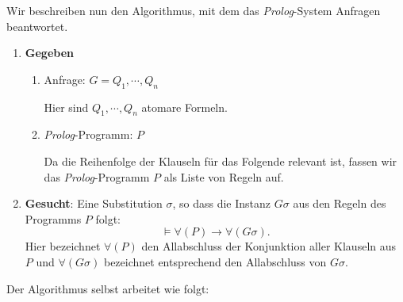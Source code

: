 Wir beschreiben nun den Algorithmus, mit dem das \textsl{Prolog}-System Anfragen
beantwortet. 

\noindent
\begin{enumerate}
\item \textbf{Gegeben}
      \begin{enumerate}
      \item Anfrage: \quad  $G = Q_1, \cdots, Q_n$

            Hier sind $Q_1, \cdots, Q_n$ atomare Formeln.
      \item \textsl{Prolog}-Programm: \quad $P$
            \vspace*{0.1cm}
        
            Da die Reihenfolge der Klauseln f\"{u}r das Folgende relevant ist, fassen wir das
            \textsl{Prolog}-Programm $P$ als Liste von Regeln auf.
      \end{enumerate}
\item \textbf{Gesucht}: Eine Substitution $\sigma$, so dass die Instanz $G\sigma$ aus den
      Regeln des Programms $P$ folgt: 
      \[ \models \forall (P) \rightarrow \forall(G\sigma). \]
      Hier bezeichnet $\forall(P)$ den Allabschluss der Konjunktion aller Klauseln aus $P$
      und $\forall(G\sigma)$ bezeichnet entsprechend den Allabschluss von $G\sigma$.
\end{enumerate}
Der Algorithmus selbst arbeitet wie folgt:
